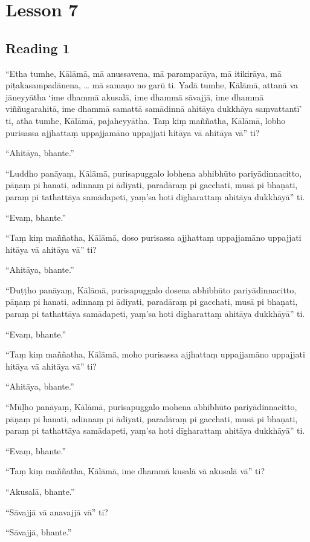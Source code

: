 \chapter{Lesson 7}

\section*{Reading 1}

“Etha tumhe, Kālāmā, mā anussavena, mā paramparāya, mā itikirāya, mā piṭakasampadānena, … mā samaṇo no garū ti. Yadā tumhe, Kālāmā, attanā va jāneyyātha ‘ime dhammā akusalā, ime dhammā sāvajjā, ime dhammā viññugarahitā, ime dhammā samattā samādinnā ahitāya dukkhāya saṃvattantī’ ti, atha tumhe, Kālāmā, pajaheyyātha. Taṃ kiṃ maññatha, Kālāmā, lobho purisassa ajjhattaṃ uppajjamāno uppajjati hitāya vā ahitāya vā” ti?

“Ahitāya, bhante.”

“Luddho panāyaṃ, Kālāmā, purisapuggalo lobhena abhibhūto pariyādinnacitto, pāṇaṃ pi hanati, adinnaṃ pi ādiyati, paradāraṃ pi gacchati, musā pi bhaṇati, paraṃ pi tathattāya samādapeti, yaṃ’sa hoti dīgharattaṃ ahitāya dukkhāyā” ti.

“Evaṃ, bhante.”

“Taṃ kiṃ maññatha, Kālāmā, doso purisassa ajjhattaṃ uppajjamāno uppajjati hitāya vā ahitāya vā” ti?

“Ahitāya, bhante.”

“Duṭṭho panāyaṃ, Kālāmā, purisapuggalo dosena abhibhūto pariyādinnacitto, pāṇaṃ pi hanati, adinnaṃ pi ādiyati, paradāraṃ pi gacchati, musā pi bhaṇati, paraṃ pi tathattāya samādapeti, yaṃ’sa hoti dīgharattaṃ ahitāya dukkhāyā” ti.

“Evaṃ, bhante.”

“Taṃ kiṃ maññatha, Kālāmā, moho purisassa ajjhattaṃ uppajjamāno uppajjati hitāya vā ahitāya vā” ti?

“Ahitāya, bhante.”

“Mūḷho panāyaṃ, Kālāmā, purisapuggalo mohena abhibhūto pariyādinnacitto, pāṇaṃ pi hanati, adinnaṃ pi ādiyati, paradāraṃ pi gacchati, musā pi bhaṇati, paraṃ pi tathattāya samādapeti, yaṃ’sa hoti dīgharattaṃ ahitāya dukkhāyā” ti.

“Evaṃ, bhante.”

“Taṃ kiṃ maññatha, Kālāmā, ime dhammā kusalā vā akusalā vā” ti?

“Akusalā, bhante.”

“Sāvajjā vā anavajjā vā” ti?

“Sāvajjā, bhante.”

